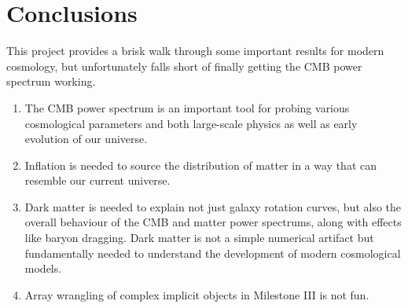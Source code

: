 \section{Conclusions}

This project provides a brisk walk through some important results for modern cosmology, but unfortunately falls short of finally getting the CMB power spectrum working. 

   \begin{enumerate}
      \item The CMB power spectrum is an important tool for probing various cosmological parameters and both large-scale physics as well as early evolution of our universe.
      \item Inflation is needed to source the distribution of matter in a way that can resemble our current universe.
      \item Dark matter is needed to explain not just galaxy rotation curves, but also the overall behaviour of the CMB and matter power spectrums, along with effects like baryon dragging. Dark matter is not a simple numerical artifact but fundamentally needed to understand the development of modern cosmological models.
      \item Array wrangling of complex implicit objects in Milestone III is not fun.
   \end{enumerate}

\begin{acknowledgements}
\end{acknowledgements}
